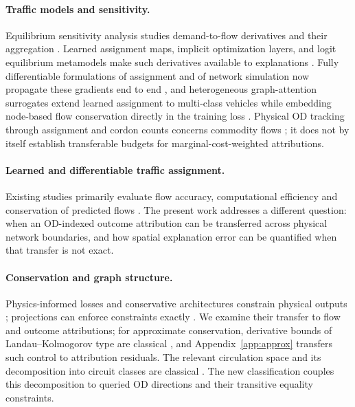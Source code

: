 \documentclass[a4paper,fleqn]{cas-sc}
\begin{document}
\paragraph{Traffic models and sensitivity.}
Equilibrium sensitivity analysis studies demand-to-flow derivatives and their
aggregation \citep{tobin1988sensitivity,yang2005sensitivity,josefsson2007sensitivity,patriksson2003aggregated}.
Learned assignment maps, implicit optimization layers, and logit equilibrium
metamodels make such derivatives available to explanations
\citep{liu2023endtoend,amos2017optnet,lassen2025learning}.
Fully differentiable formulations of assignment and of network simulation
now propagate these gradients end to end
\citep{li2026differentiable,seo2026differentiable}, and heterogeneous
graph-attention surrogates extend learned assignment to multi-class
vehicles while embedding node-based flow conservation directly in the
training loss \citep{liu2024heterogeneous,liu2025multiclass}.
Physical OD tracking through assignment and cordon counts concerns commodity
flows \citep{sheffi1985urban,vanzuylen1980most,bar2002origin}; it does not by
itself establish transferable budgets for marginal-cost-weighted attributions.

\paragraph{Learned and differentiable traffic assignment.}
Existing studies primarily evaluate flow accuracy, computational efficiency
and conservation of predicted flows
\citep{liu2023endtoend,liu2024heterogeneous,liu2025multiclass,li2026differentiable}.
The present work addresses a different question: when an OD-indexed outcome
attribution can be transferred across physical network boundaries, and how
spatial explanation error can be quantified when that transfer is not exact.

\paragraph{Conservation and graph structure.}
Physics-informed losses and conservative architectures constrain physical
outputs \citep{raissi2019physics,shi2021physics,richterpowell2022neural};
projections can enforce constraints exactly \citep{valente2025physics,baez2024guaranteeing}.
We examine their transfer to flow and outcome attributions; for
approximate conservation, derivative bounds of Landau--Kolmogorov type
are classical \citep{shadrin2014landau}, and
Appendix~\ref{app:approx} transfers such control to attribution
residuals. The relevant
circulation space and its decomposition into circuit classes are classical
\citep{oxley2011matroid,hopcroft1973algorithm}. The new classification couples
this decomposition to queried OD directions and their transitive equality
constraints.
\end{document}

